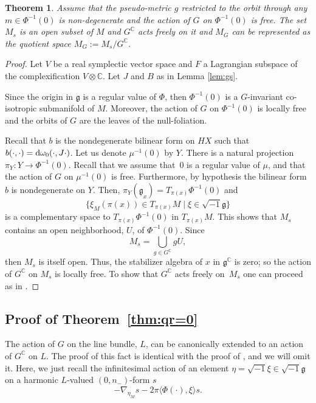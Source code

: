 \documentclass[10pt,a4paper]{amsart}
\numberwithin{equation}{section}
\newtheorem{Theorem}{Theorem}[section]
\begin{document}
 	\begin{Theorem}
 		Assume that the pseudo-metric $g$ restricted to the orbit through any $m\in \Phi^{-1}(0)$ is non-degenerate and the action of $G$ on $\Phi^{-1}(0)$ is free.
 		The set $M_s$ is an open subset of $M$ and $G^{\mathbb{C}}$ acts freely on it and $M_G$ can be represented as the quotient space $M_G:=M_s/G^{\mathbb{C}}$.
 	\end{Theorem}
 	\begin{proof}
 		Let $V$ be a real symplectic vector space and $F$ a	Lagrangian subspace of the complexification $V\otimes \mathbb{C}$. Let $J$ and $B$ as in Lemma \ref{lem:gs}.

 		Since the origin in $\mathfrak{g}$ is a regular value of $\Phi$, then $\Phi^{-1}(0)$ is a $G$-invariant co-isotropic submanifold of $M$. Moreover, the action of $G$ on $\Phi^{-1}(0)$ is locally free and the orbits of $G$ are the leaves of the null-foliation.
 		
 		Recall that $b$ is the nondegenerate bilinear form on $HX$ such that
$b(\cdot , \cdot) = {\rm d}\omega_0(\cdot , J\cdot)$.
 		Let us denote $\mu^{-1}(0)$ by $Y$. There is a natural projection $\pi_Y \colon Y\rightarrow \Phi^{-1}(0)$. Recall that we assume that~$0$ is a regular value of $\mu$, and that the action of $G$ on $\mu^{-1}(0)$ is free. Furthermore, by hypothesis the bilinear form~$b$ is nondegenerate on $Y$. Then,
 		$\pi_Y(\underline{\mathfrak{g}}_x)=T_{\pi(x)}\Phi^{-1}(0) $
 		and
 		\[\big\{{\xi}_M(\pi(x))\in T_{\pi(x)}M \mid \xi\in \sqrt{-1} \mathfrak{g} \big\} \]
 		is a complementary space to $T_{\pi(x)}\Phi^{-1}(0)$ in $T_{\pi(x)}M$. This shows that $M_s$ contains an
 		open neighborhood, $U$, of $\Phi^{-1}(0)$. Since
 		\[M_s=\bigcup_{g\in G^{\mathbb{C}} } g U,\]
 		then $M_s$ is itself open. Thus, the stabilizer algebra of $x$ in $\mathfrak{g}^{\mathbb{C}}$ is zero; so the action of $G^{\mathbb{C}}$ on $M_s$ is locally free. To show that $G^{\mathbb{C}}$ acts freely on~$M_s$ one can proceed as in \cite[the second part of Theorem 4.5, p.~527]{gs}.
 	\end{proof}

 	\subsection[Proof of Theorem \ref{thm:qr=0}]{Proof of Theorem~\ref{thm:qr=0}}
 	\label{sec:proofof1.2}
 	
 	The action of $G$ on the line bundle, $L$, can be canonically extended to an action of $G^{\mathbb{C}}$ on $L$. The proof of this fact is identical with the proof of \cite[Theorem 5.1]{gs}, and we will omit it. Here, we just recall the infinitesimal action of an element $\eta=\sqrt{-1} \xi\in \sqrt{-1}\mathfrak{g}$ on a harmonic $L$-valued $(0,n_-)$-form $s$
 	\begin{equation} \label{eq:5.3}
 		-\nabla_{\eta_M} s-2\pi \langle\Phi(\cdot), {\xi}\rangle s .
 	\end{equation}
 	
\end{document}

